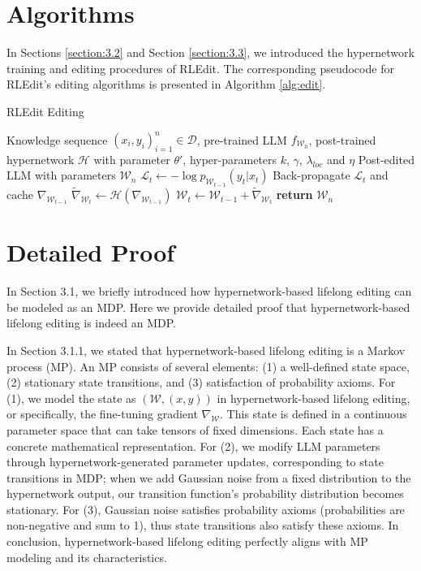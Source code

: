 \section{Algorithms}
\label{app:algorithm}
In Sections \ref{section:3.2} and Section \ref{section:3.3}, we introduced the hypernetwork training and editing procedures of RLEdit. The corresponding pseudocode for RLEdit's editing algorithms is presented in Algorithm \ref{alg:edit}.

\begin{algorithm}[tbh]
   \caption{RLEdit Editing}
   \label{alg:edit}
\begin{algorithmic}
    Knowledge sequence $(x_i,y_i)_{i=1}^n\in \mathcal{D}$, pre-trained LLM $f_{\mathcal{W}_0}$, post-trained hypernetwork $\mathcal{H}$ with parameter $\theta'$, hyper-parameters $k$, $\gamma$, $\lambda_{loc}$ and $\eta$
    Post-edited LLM with parameters $\mathcal{W}_n$
   \STATE $\mathcal{L}_t\leftarrow -\log{p_{\mathcal{W}_{t-1}}\left(y_t\left|x_t\right.\right)}$
   \STATE Back-propagate $\mathcal{L}_t$ and cache $\nabla_{\mathcal{W}_{t-1}}$
   \STATE $\tilde{\nabla}_{\mathcal{W}_t}\leftarrow \mathcal{H}(\nabla_{\mathcal{W}_{t-1}})$
   \STATE $\mathcal{W}_t\leftarrow \mathcal{W}_{t-1}+\tilde{\nabla}_{\mathcal{W}_t}$
   \ENDFOR
   \STATE \textbf{return} $\mathcal{W}_n$
\end{algorithmic}
\end{algorithm}

\newpage

\section{Detailed Proof}
\label{app:proof}
In Section 3.1, we briefly introduced how hypernetwork-based lifelong editing can be modeled as an MDP. Here we provide detailed proof that hypernetwork-based lifelong editing is indeed an MDP.

In Section 3.1.1, we stated that hypernetwork-based lifelong editing is a Markov process (MP). An MP consists of several elements: (1) a well-defined state space, (2) stationary state transitions, and (3) satisfaction of probability axioms. For (1), we model the state as $(\mathcal{W}, (x, y))$ in hypernetwork-based lifelong editing, or specifically, the fine-tuning gradient $\nabla_\mathcal{W}$. This state is defined in a continuous parameter space that can take tensors of fixed dimensions. Each state has a concrete mathematical representation. For (2), we modify LLM parameters through hypernetwork-generated parameter updates, corresponding to state transitions in MDP; when we add Gaussian noise from a fixed distribution to the hypernetwork output, our transition function's probability distribution becomes stationary. For (3), Gaussian noise satisfies probability axioms (probabilities are non-negative and sum to 1), thus state transitions also satisfy these axioms. In conclusion, hypernetwork-based lifelong editing perfectly aligns with MP modeling and its characteristics.

